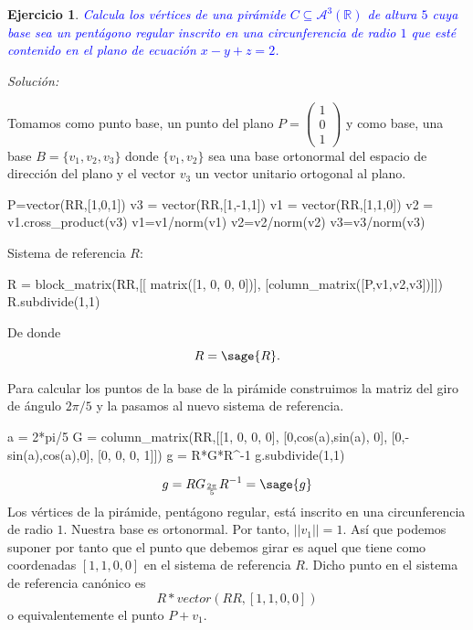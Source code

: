 \documentclass{amsart}
\newtheorem{ejer}{Ejercicio}
\begin{document}


\newpage


\begin{ejer}
\textcolor{blue}{Calcula los vértices de una {\sc pirámide} $C \subseteq \mathcal{A}^3(\mathbb R)$ de altura $5$ cuya base 
sea un pentágono regular inscrito en una circunferencia de radio $1$ que esté contenido en el plano de ecuación $x-y+z=2$.} 
\end{ejer}

{\it Solución:}


Tomamos como punto base, un punto del plano $P = \left( \begin{array}{r} 1 \\ 0 \\ 1 \end{array} \right)$ y como base, una base $B = \{ v_1,v_2,v_3 \}$ donde $\{ v_1,v_2 \}$ sea una base ortonormal del espacio de dirección del plano y el vector $v_3$ un vector unitario ortogonal al plano.

\begin{sageblock}
P=vector(RR,[1,0,1])
v3 = vector(RR,[1,-1,1])
v1 = vector(RR,[1,1,0])
v2 = v1.cross_product(v3)
v1=v1/norm(v1)
v2=v2/norm(v2)
v3=v3/norm(v3)
\end{sageblock}

Sistema de referencia $R$:

\begin{sageblock}
R = block_matrix(RR,[[       matrix([1, 0, 0, 0])],
                     [column_matrix([P,v1,v2,v3])]])
R.subdivide(1,1)
\end{sageblock}

De donde \[ R = \sage{R}. \]

Para calcular los puntos de la base de la pirámide construimos la matriz del 
giro de ángulo $2\pi/5$ y la pasamos al nuevo sistema de referencia.
\begin{sageblock}
a = 2*pi/5
G = column_matrix(RR,[[1,    0,     0,  0],
                     [0,cos(a),sin(a), 0],
                     [0,-sin(a),cos(a),0],
                     [0,    0,     0,  1]])
g = R*G*R^-1
g.subdivide(1,1)
\end{sageblock}
$$g=RG_{\frac{2\pi}{5}}R^{-1}=\sage{g}$$
Los vértices de la pirámide, pentágono regular, está inscrito en una circunferencia de radio $1$. Nuestra base es ortonormal. Por tanto, $||v_1||=1$. Así que podemos suponer por tanto que el punto que debemos girar es aquel que tiene como coordenadas $[1,1,0,0]$ en el sistema de referencia $R$. Dicho punto en el sistema de referencia canónico es $$R*vector(RR,[1,1,0,0])$$  o equivalentemente el punto $P+v_1$.
\end{document}
